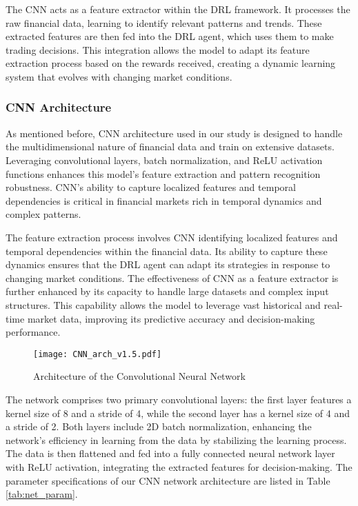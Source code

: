 The CNN acts as a feature extractor within the DRL framework. It processes the raw financial data, learning to identify relevant patterns and trends. These extracted features are then fed into the DRL agent, which uses them to make trading decisions. This integration allows the model to adapt its feature extraction process based on the rewards received, creating a dynamic learning system that evolves with changing market conditions.

\subsubsection{CNN Architecture}
As mentioned before, CNN architecture used in our study is designed to handle the multidimensional nature of financial data and train on extensive datasets. Leveraging convolutional layers, batch normalization, and ReLU activation functions enhances this model's feature extraction and pattern recognition robustness. CNN's ability to capture localized features and temporal dependencies is critical in financial markets rich in temporal dynamics and complex patterns.

The feature extraction process involves CNN identifying localized features and temporal dependencies within the financial data. Its ability to capture these dynamics ensures that the DRL agent can adapt its strategies in response to changing market conditions. The effectiveness of CNN as a feature extractor is further enhanced by its capacity to handle large datasets and complex input structures. This capability allows the model to leverage vast historical and real-time market data, improving its predictive accuracy and decision-making performance.

\begin{figure*}
    \texttt{[image: CNN\_arch\_v1.5.pdf]}
    \caption{Architecture of the Convolutional Neural Network}
    \label{fig:architecture_of_network}
\end{figure*}

The network comprises two primary convolutional layers: the first layer features a kernel size of 8 and a stride of 4, while the second layer has a kernel size of 4 and a stride of 2. Both layers include 2D batch normalization, enhancing the network's efficiency in learning from the data by stabilizing the learning process. The data is then flattened and fed into a fully connected neural network layer with ReLU activation, integrating the extracted features for decision-making. The parameter specifications of our CNN network architecture are listed in Table \ref{tab:net_param}. 

